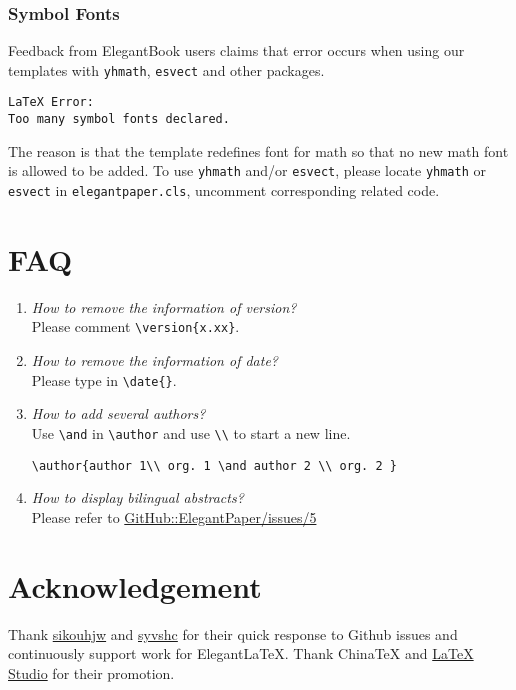 \documentclass[lang=cn,a4paper,bibend=bibtex]{elegantcs}
\begin{document}
\subsubsection{Symbol Fonts}
Feedback from ElegantBook users claims that error occurs when using our templates with  \lstinline{yhmath}, \lstinline{esvect} and other packages.
\begin{lstlisting}[style=Latex]
LaTeX Error:
Too many symbol fonts declared.
\end{lstlisting}

The reason is that the template redefines font for math so that no new math font is allowed to be added. To use \lstinline{yhmath} and/or \lstinline{esvect}, please locate \lstinline{yhmath} or \lstinline{esvect} in \lstinline{elegantpaper.cls}, uncomment corresponding related code.


\section{FAQ}

\begin{enumerate}[label=\arabic*).]
  \item \textit{How to remove the information of version?}\\
  Please comment \lstinline|\version{x.xx}|.
  \item \textit{How to remove the information of date?}\\
  Please type in \lstinline|\date{}|.
  \item \textit{How to add several authors?}\\
  Use \lstinline{\and} in \lstinline{\author} and use \lstinline{\\} to start a new line.
  \begin{lstlisting}[style=Latex]
  \author{author 1\\ org. 1 \and author 2 \\ org. 2 }
  \end{lstlisting}
  \item \textit{How to display bilingual abstracts?}\\
  Please refer to \href{https://github.com/ElegantLaTeX/ElegantPaper/issues/5}{GitHub::ElegantPaper/issues/5}
\end{enumerate}

\section{Acknowledgement}

Thank \href{https://github.com/sikouhjw}{sikouhjw} and \href{https://github.com/syvshc}{syvshc} for their quick response to Github issues and continuously support work for ElegantLaTeX. Thank ChinaTeX and \href{http://www.latexstudio.net/}{LaTeX Studio} for their promotion.



\printbibliography[heading=bibintoc, title=\ebibname]
\appendix
\addappheadtotoc
\end{document}
